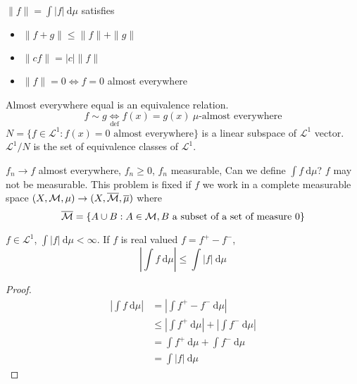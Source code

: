 


\begin{remark}
  $\|f\| = \int |f|\ \mathrm{d}\mu$ satisfies
  \begin{itemize}
    \item $\|f + g\| \le \|f\| + \|g\|$
    \item $\|c f\| = |c|\|f\|$
    \item $\|f\| = 0 \iff f = 0$ almost everywhere
  \end{itemize}
\end{remark}

\begin{remark}
  Almost everywhere equal is an equivalence relation.
  \[f \sim g \underset{\text{def}}\iff f(x) = g(x)\ \mu\text{-almost everywhere}\]
  $N = \{f \in\mathcal{L}^1 : f(x) = 0 \text{ almost everywhere}\}$ is a linear subspace of $\mathcal{L}^1$ vector.
  $\mathcal{L}^1/N$ is the set of equivalence classes of $\mathcal{L}^1$.
\end{remark}

$f_n \to f$ almost everywhere, $f_n \ge 0$, $f_n$ measurable, Can we define $\int f\ \mathrm{d}\mu$?
$f$ may not be measurable. This problem is fixed if $f$ we work in a complete measurable space
$(X, \mathcal M, \mu) \to (X, \overline{\mathcal M}, \overline{\mu})$
where 
\[\overline{\mathcal M} = \{A \cup B : A \in \mathcal M, B \text{ a subset of a set of measure }0\}\]

\begin{lemma}
$f \in \mathcal{L}^1$, $\int |f|\ \mathrm{d}\mu < \infty$. If $f$ is real valued $f = f^+ - f^-$,
\[\left|\int f\ \mathrm{d}\mu \right| \le \int |f| \ \mathrm{d}\mu\]
\end{lemma}
\begin{proof}
  \begin{align*}
    \left|\int f\ \mathrm{d}\mu \right| &= \left|\int f^+ - f^- \ \mathrm{d}\mu \right| \\
    &\le \left|\int f^+ \ \mathrm{d}\mu \right| + \left|\int f^- \ \mathrm{d}\mu \right| \\
    &= \int f^+ \ \mathrm{d}\mu + \int f^- \ \mathrm{d}\mu \\
    &= \int |f| \ \mathrm{d}\mu
  \end{align*}
\end{proof}

